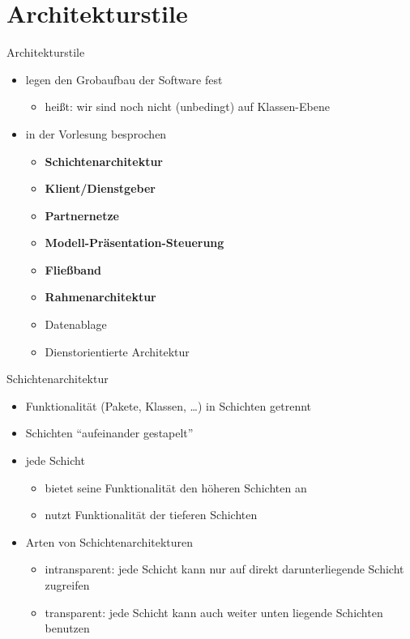\documentclass[18pt]{beamer}
\begin{document}
\section{Architekturstile}
	\begin{frame}{Architekturstile}
		\begin{itemize}
			\item legen den Grobaufbau der Software fest
			\begin{itemize}
				\item heißt: wir sind noch nicht (unbedingt) auf Klassen-Ebene 
			\end{itemize}
			\item in der Vorlesung besprochen
			\begin{itemize}
				\item \textbf{Schichtenarchitektur}
				\item \textbf{Klient/Dienstgeber} 
				\item \textbf{Partnernetze}
				\item \textbf{Modell-Präsentation-Steuerung}
				\item \textbf{Fließband}
				\item \textbf{Rahmenarchitektur}
				\item Datenablage
				\item Dienstorientierte Architektur
			\end{itemize}
		\end{itemize}
	\end{frame}

	\begin{frame}{Schichtenarchitektur}
	\begin{itemize}
		\item Funktionalität (Pakete, Klassen, \dots) in Schichten getrennt
		\item Schichten \enquote{aufeinander gestapelt}
		\item jede Schicht
		\begin{itemize}
			\item bietet seine Funktionalität den höheren Schichten an
			\item nutzt Funktionalität der tieferen Schichten
		\end{itemize}
		\item Arten von Schichtenarchitekturen
		\begin{itemize}
			\item intransparent: jede Schicht kann nur auf direkt darunterliegende Schicht zugreifen
			\item transparent: jede Schicht kann auch weiter unten liegende Schichten benutzen
		\end{itemize}
	\end{itemize}
	\end{frame}
\end{document}
